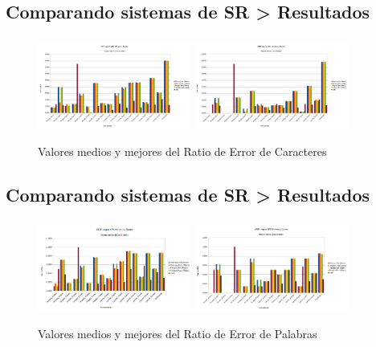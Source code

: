 \subsection{Comparando sistemas de SR > Resultados}
\begin{frame}
  \frametitle{\insertsectionhead}
  \framesubtitle{\insertsubsectionhead}
  \begin{figure}
  	\includegraphics[width=0.45\textwidth]{images/CERMedios.png}
  	\includegraphics[width=0.45\textwidth]{images/CERMejores.png}
  	\caption{Valores medios y mejores del Ratio de Error de Caracteres}
  \end{figure}

\end{frame}

\subsection{Comparando sistemas de SR > Resultados}
\begin{frame}
	\frametitle{\insertsectionhead}
	\framesubtitle{\insertsubsectionhead}
	\begin{figure}
		\includegraphics[width=0.45\textwidth]{images/WERMedios.png}
		\includegraphics[width=0.45\textwidth]{images/WERMejores.png}
		\caption{Valores medios y mejores del Ratio de Error de Palabras}
	\end{figure}
	
\end{frame}



